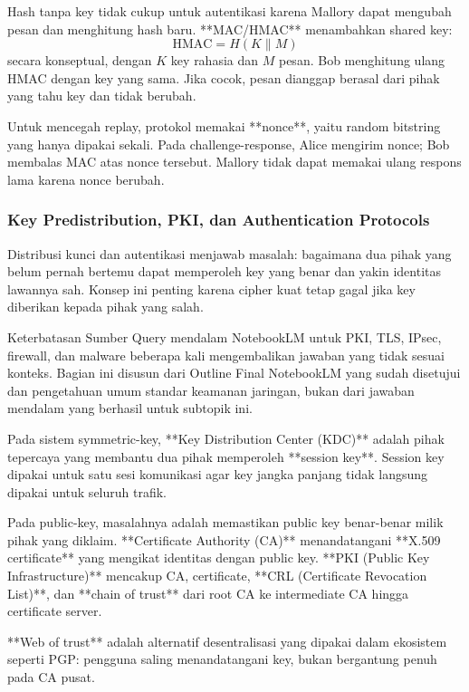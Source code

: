 Hash tanpa key tidak cukup untuk autentikasi karena Mallory dapat mengubah pesan dan menghitung hash baru. **MAC/HMAC** menambahkan shared key:
\[
    \text{HMAC} = H(K \parallel M)
\]
secara konseptual, dengan $K$ key rahasia dan $M$ pesan. Bob menghitung ulang HMAC dengan key yang sama. Jika cocok, pesan dianggap berasal dari pihak yang tahu key dan tidak berubah.

Untuk mencegah replay, protokol memakai **nonce**, yaitu random bitstring yang hanya dipakai sekali. Pada challenge-response, Alice mengirim nonce; Bob membalas MAC atas nonce tersebut. Mallory tidak dapat memakai ulang respons lama karena nonce berubah.

\subsubsection{Key Predistribution, PKI, dan Authentication Protocols}
\begin{jawab}
Distribusi kunci dan autentikasi menjawab masalah: bagaimana dua pihak yang belum pernah bertemu dapat memperoleh key yang benar dan yakin identitas lawannya sah. Konsep ini penting karena cipher kuat tetap gagal jika key diberikan kepada pihak yang salah.
\end{jawab}

\begin{cmt}{Keterbatasan Sumber}{}
Query mendalam NotebookLM untuk PKI, TLS, IPsec, firewall, dan malware beberapa kali mengembalikan jawaban yang tidak sesuai konteks. Bagian ini disusun dari Outline Final NotebookLM yang sudah disetujui dan pengetahuan umum standar keamanan jaringan, bukan dari jawaban mendalam yang berhasil untuk subtopik ini.
\end{cmt}

Pada sistem symmetric-key, **Key Distribution Center (KDC)** adalah pihak tepercaya yang membantu dua pihak memperoleh **session key**. Session key dipakai untuk satu sesi komunikasi agar key jangka panjang tidak langsung dipakai untuk seluruh trafik.

Pada public-key, masalahnya adalah memastikan public key benar-benar milik pihak yang diklaim. **Certificate Authority (CA)** menandatangani **X.509 certificate** yang mengikat identitas dengan public key. **PKI (Public Key Infrastructure)** mencakup CA, certificate, **CRL (Certificate Revocation List)**, dan **chain of trust** dari root CA ke intermediate CA hingga certificate server.

**Web of trust** adalah alternatif desentralisasi yang dipakai dalam ekosistem seperti PGP: pengguna saling menandatangani key, bukan bergantung penuh pada CA pusat.


